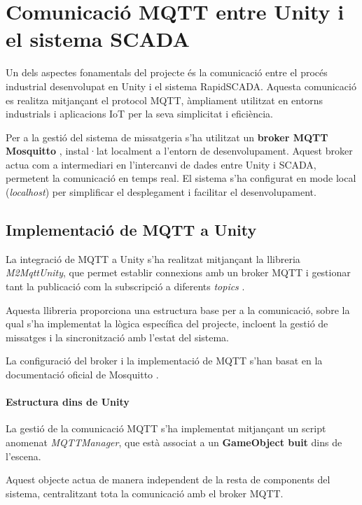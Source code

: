 \documentclass[12pt,a4paper]{report}
\begin{document}
\chapter{Comunicació MQTT entre Unity i el sistema SCADA}

Un dels aspectes fonamentals del projecte és la comunicació entre el procés industrial desenvolupat en Unity i el sistema RapidSCADA. Aquesta comunicació es realitza mitjançant el protocol MQTT, àmpliament utilitzat en entorns industrials i aplicacions IoT per la seva simplicitat i eficiència.

Per a la gestió del sistema de missatgeria s'ha utilitzat un \textbf{broker MQTT Mosquitto} \cite{mosquitto_download}, instal·lat localment a l'entorn de desenvolupament. Aquest broker actua com a intermediari en l'intercanvi de dades entre Unity i SCADA, permetent la comunicació en temps real. El sistema s'ha configurat en mode local (\textit{localhost}) per simplificar el desplegament i facilitar el desenvolupament.

\section{Implementació de MQTT a Unity}

La integració de MQTT a Unity s'ha realitzat mitjançant la llibreria \textit{M2MqttUnity}, que permet establir connexions amb un broker MQTT i gestionar tant la publicació com la subscripció a diferents \textit{topics} \cite{mqtt_unity_guide}.

Aquesta llibreria proporciona una estructura base per a la comunicació, sobre la qual s'ha implementat la lògica específica del projecte, incloent la gestió de missatges i la sincronització amb l'estat del sistema.

La configuració del broker i la implementació de MQTT s'han basat en la documentació oficial de Mosquitto \cite{mosquitto_download}.

\subsubsection{Estructura dins de Unity}

La gestió de la comunicació MQTT s'ha implementat mitjançant un script anomenat \textit{MQTTManager}, que està associat a un \textbf{GameObject buit} \cite{UnityGameObjects} dins de l'escena.

Aquest objecte actua de manera independent de la resta de components del sistema, centralitzant tota la comunicació amb el broker MQTT.
\end{document}
